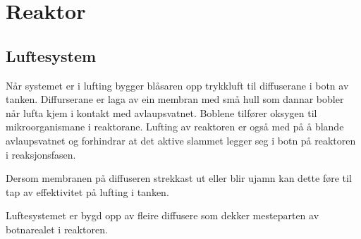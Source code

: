 \newpage
\section{Reaktor}
\subsection{Luftesystem}
Når systemet er i lufting bygger blåsaren opp trykkluft til diffuserane i botn av tanken. 
Diffurserane er laga av ein membran med små hull som dannar bobler når lufta kjem i kontakt med avlaupsvatnet. Boblene tilfører oksygen til mikroorganismane i reaktorane. 
Lufting av reaktoren er også med på å blande avlaupsvatnet og forhindrar at det aktive slammet legger seg i botn på reaktoren i reaksjonsfasen.

Dersom membranen på diffuseren strekkast ut eller blir ujamn kan dette føre til tap av effektivitet på lufting i tanken.

Luftesystemet er bygd opp av fleire diffusere som dekker mesteparten av botnarealet i reaktoren.

